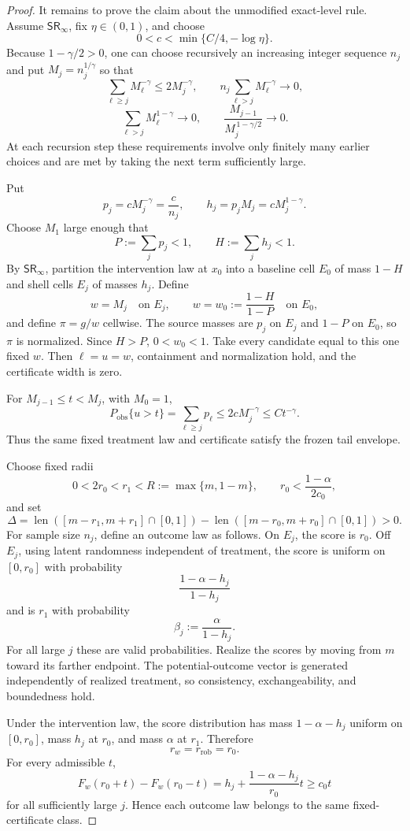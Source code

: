 \documentclass{article}
\begin{document}
\begin{proof}
It remains to prove the claim about the unmodified exact-level rule. Assume \(\mathsf{SR}_\infty\), fix \(\eta\in(0,1)\), and choose
\[
0<c<\min\{C/4,-\log\eta\}.
\]
Because \(1-\gamma/2>0\), one can choose recursively an increasing integer sequence \(n_j\) and put \(M_j=n_j^{1/\gamma}\) so that
\[
\sum_{\ell\ge j}M_\ell^{-\gamma}
 \le2M_j^{-\gamma},\qquad
n_j\sum_{\ell>j}M_\ell^{-\gamma}\longrightarrow0,
\]
\[
\sum_{\ell>j}M_\ell^{1-\gamma}\longrightarrow0,\qquad
\frac{M_{j-1}}{M_j^{\,1-\gamma/2}}\longrightarrow0.
\]
At each recursion step these requirements involve only finitely many earlier choices and are met by taking the next term sufficiently large.

Put
\[
p_j=cM_j^{-\gamma}=\frac c{n_j},\qquad
h_j=p_jM_j=cM_j^{1-\gamma}.
\]
Choose \(M_1\) large enough that
\[
P:=\sum_jp_j<1,\qquad H:=\sum_jh_j<1.
\]
By \(\mathsf{SR}_\infty\), partition the intervention law at \(x_0\) into a baseline cell \(E_0\) of mass \(1-H\) and shell cells \(E_j\) of masses \(h_j\). Define
\[
w=M_j\quad\text{on }E_j,\qquad
w=w_0:=\frac{1-H}{1-P}\quad\text{on }E_0,
\]
and define \(\pi=g/w\) cellwise. The source masses are \(p_j\) on \(E_j\) and \(1-P\) on \(E_0\), so \(\pi\) is normalized. Since \(H>P\), \(0<w_0<1\). Take every candidate equal to this one fixed \(w\). Then \(\ell=u=w\), containment and normalization hold, and the certificate width is zero.

For \(M_{j-1}\le t<M_j\), with \(M_0=1\),
\[
P_{\mathrm{obs}}\{u>t\}
 =\sum_{\ell\ge j}p_\ell
 \le2cM_j^{-\gamma}
 \le Ct^{-\gamma}.
\]
Thus the same fixed treatment law and certificate satisfy the frozen tail envelope.

Choose fixed radii
\[
0<2r_0<r_1<R:=\max\{m,1-m\},\qquad
r_0<\frac{1-\alpha}{2c_0},
\]
and set
\[
\Delta=
\operatorname{len}([m-r_1,m+r_1]\cap[0,1])
-\operatorname{len}([m-r_0,m+r_0]\cap[0,1])>0.
\]
For sample size \(n_j\), define an outcome law as follows. On \(E_j\), the score is \(r_0\). Off \(E_j\), using latent randomness independent of treatment, the score is uniform on \([0,r_0]\) with probability
\[
\frac{1-\alpha-h_j}{1-h_j}
\]
and is \(r_1\) with probability
\[
\beta_j:=\frac{\alpha}{1-h_j}.
\]
For all large \(j\) these are valid probabilities. Realize the scores by moving from \(m\) toward its farther endpoint. The potential-outcome vector is generated independently of realized treatment, so consistency, exchangeability, and boundedness hold.

Under the intervention law, the score distribution has mass \(1-\alpha-h_j\) uniform on \([0,r_0]\), mass \(h_j\) at \(r_0\), and mass \(\alpha\) at \(r_1\). Therefore
\[
r_w=r_{\mathrm{rob}}=r_0.
\]
For every admissible \(t\),
\[
F_w(r_0+t)-F_w(r_0-t)
 =h_j+\frac{1-\alpha-h_j}{r_0}t
 \ge c_0t
\]
for all sufficiently large \(j\). Hence each outcome law belongs to the same fixed-certificate class.


\end{proof}
\end{document}
